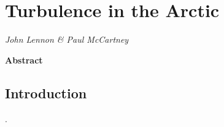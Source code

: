 
\chapter{Turbulence in the Arctic}
\label{john:turbulence}

\begin{center}								%

\textit{John Lennon \& Paul McCartney}				%

\vspace{1cm}

\begin{minipage}{0.9\textwidth}				%
\centerline{\textbf{\large Abstract}}
\vspace{0.3cm}
\lipsum[1]									%

\end{minipage}
\end{center}

\vspace{1cm}

\section{Introduction}		%
\label{john:introduction}
\lipsum[1] \citep{nilsen2016simple}.		%

